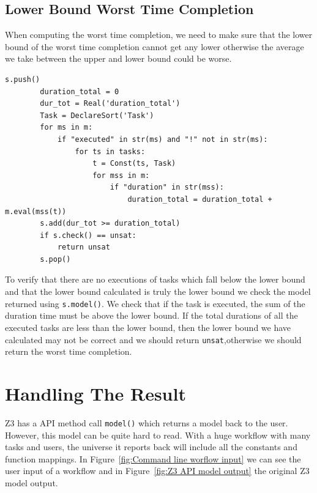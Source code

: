 \documentclass[a4paper]{report}
\begin{document}
\subsection{Lower Bound Worst Time Completion}
When computing the worst time completion, we need to make sure that the lower bound of the worst time completion cannot get any lower otherwise the average we take between the upper and lower bound could be worse.

\begin{lstlisting}[frame=single]
s.push()
        duration_total = 0
        dur_tot = Real('duration_total')
        Task = DeclareSort('Task')
        for ms in m:
            if "executed" in str(ms) and "!" not in str(ms):
                for ts in tasks:
                    t = Const(ts, Task)
                    for mss in m:
                        if "duration" in str(mss):
                            duration_total = duration_total + m.eval(mss(t))
        s.add(dur_tot >= duration_total)
        if s.check() == unsat:
            return unsat
        s.pop()
\end{lstlisting}

To verify that there are no executions of tasks which fall below the lower bound and that the lower bound calculated is truly the lower bound we check the model returned using \texttt{s.model()}. We check that if the task is executed, the sum of the duration time must be above the lower bound. If the total durations of all the executed tasks are less than the lower bound, then the lower bound we have calculated may not be correct and we should return \texttt{unsat},otherwise we should return the worst time completion. 

\section{Handling The Result}
Z3 has a API method call \texttt{model()} which returns a model back to the user. However, this model can be quite hard to read. With a huge workflow with many tasks and users, the universe it reports back will include all the constants and function mappings. In Figure~\ref{fig:Command line worflow input} we can see the user input of a workflow and in Figure~\ref{fig:Z3 API model output} the original Z3 model output. 
\end{document}
